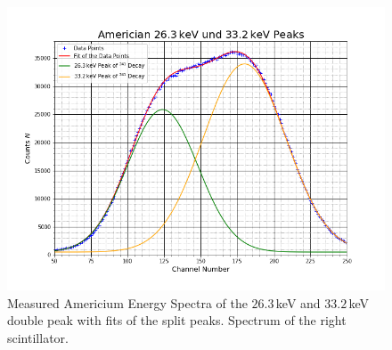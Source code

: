 \documentclass[30pt,a4paper]{article}
\begin{document}
	\begin{figure}[h]
		\includegraphics[scale=0.5]{Bilder/kleine_Peaks1}
		\centering
		\caption[Americium Spectra Double Peak Right Detector Side]{Measured Americium Energy Spectra of the $26.3$\,keV and $33.2$\,keV double peak with fits of the split peaks. Spectrum of the right scintillator.}
		\label{ASR}
	\end{figure}
\end{document}
